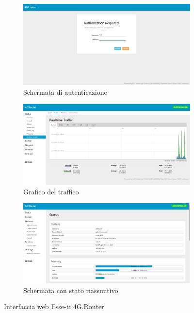 \begin{figure}[H]

	\newlength{\tempheight}
	\setlength{\tempheight}{23ex}

	\centering%
	\begin{subfigure}[t]{0.5\textwidth}
		\centering%
		\includegraphics[totalheight=\tempheight]{immagini/interfacciar4g_init}
		\caption{Schermata di autenticazione}
	\end{subfigure}%
	\hfill
	\begin{subfigure}[t]{0.5\textwidth}
		\centering%
		\includegraphics[totalheight=\tempheight]{immagini/interfacciar4g_traffic}
		\caption{Grafico del traffico}
	\end{subfigure}

	\medskip

	\begin{subfigure}[b]{\textwidth}
		\centering%
		\includegraphics[totalheight=2\tempheight]{immagini/interfacciar4g_status}
		\caption{Schermata con stato riassuntivo}
	\end{subfigure}
	\caption{Interfaccia web Esse-ti 4G.Router}

\end{figure}

